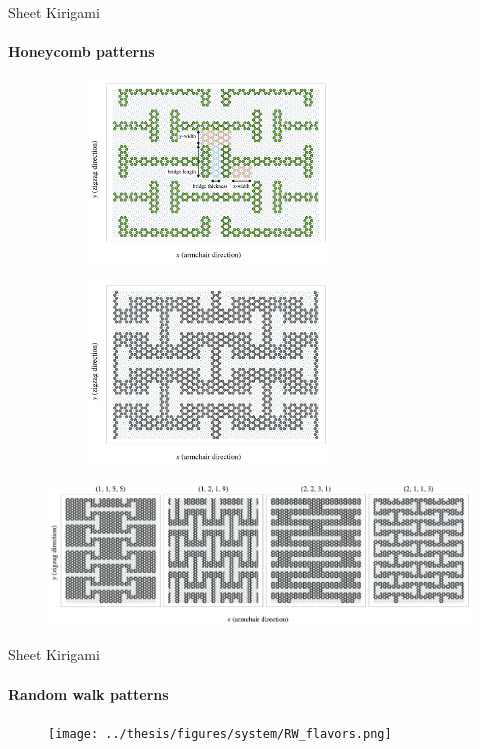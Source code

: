\documentclass[
	10pt, %
]{beamer}
\begin{document}
%
%
\begin{frame}{Sheet Kirigami}
	\framesubtitle{Honeycomb patterns}

	\begin{figure}[H]
		\centering
		\begin{subfigure}[t]{0.48\textwidth}
			\centering
			\raggedleft
			\includegraphics[width=0.7\textwidth]{../thesis/figures/system/honeycomb_inverse.pdf}
		  \end{subfigure}
		  \hfill
		  \begin{subfigure}[t]{0.48\textwidth}
			\centering
			\raggedright
			\includegraphics[width=0.7\textwidth]{../thesis/figures/system/honeycomb_pattern.pdf}
		\end{subfigure}
	  \end{figure}
	  
	  
	  \begin{figure}[H]
		\centering
		\includegraphics[width=\linewidth]{../thesis/figures/system/honeycomb_flavors.pdf}
	  \end{figure}
\end{frame}
%
%
\begin{frame}{Sheet Kirigami}
	\framesubtitle{Random walk patterns}
	\begin{figure}[H]
		\centering
		\texttt{[image: ../thesis/figures/system/RW\_flavors.png]}
	\end{figure}
\end{frame}
%
%
\end{document}
